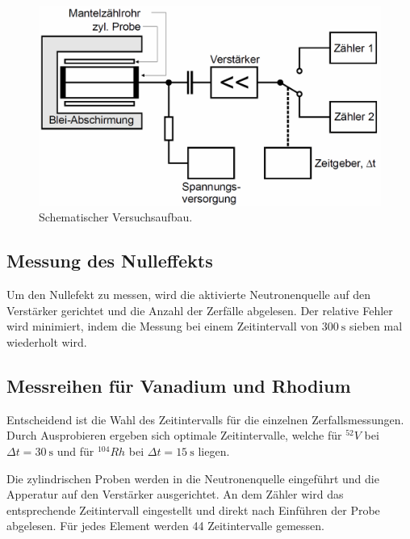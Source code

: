 \begin{figure}
    \centering
    \includegraphics[width=.9\textwidth]{plots/Versuch.png}
    \caption{Schematischer Versuchsaufbau.\cite{Versuchsanleitung}}
    \label{fig:schVersuch}
\end{figure}

\subsection{Messung des Nulleffekts}
Um den Nullefekt zu messen, wird die aktivierte Neutronenquelle auf den Verstärker gerichtet und die Anzahl der Zerfälle abgelesen.
Der relative Fehler wird minimiert, indem die Messung bei einem Zeitintervall von $\SI{300}{\second}$ sieben mal wiederholt wird.

\subsection{Messreihen für Vanadium und Rhodium}
Entscheidend ist die Wahl des Zeitintervalls für die einzelnen Zerfallsmessungen. Durch Ausprobieren ergeben sich optimale Zeitintervalle, welche für $^{52}V$ bei $\Delta t = \SI{30}{\second}$
und für $^{104}Rh$ bei $\Delta t = \SI{15}{\second}$ liegen.

Die zylindrischen Proben werden in die Neutronenquelle eingeführt und die Apperatur auf den Verstärker ausgerichtet. An dem Zähler wird das entsprechende Zeitintervall eingestellt
und direkt nach Einführen der Probe abgelesen.
Für jedes Element werden 44 Zeitintervalle gemessen.